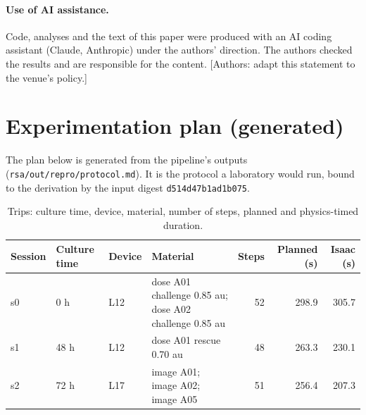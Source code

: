 \documentclass[10pt,a4paper]{article}
\begin{document}
\paragraph{Use of AI assistance.} Code, analyses and the text of this paper were produced with an AI coding assistant (Claude, Anthropic) under the authors' direction. The authors checked the results and are responsible for the content. [Authors: adapt this statement to the venue's policy.]



\appendix

\section{Experimentation plan (generated)}\label{sec:protocol}

The plan below is generated from the pipeline's outputs (\texttt{rsa/out/repro/protocol.md}). It is the protocol a laboratory would run, bound to the derivation by the input digest \texttt{d514d47b1ad1b075}.

\begin{table}[tbp]\centering\small
\caption{Trips: culture time, device, material, number of steps, planned and physics-timed duration.}\label{tab:sessions}
\begin{tabularx}{\linewidth}{lllXrrr}\toprule
\textbf{Session} & \textbf{Culture time} & \textbf{Device} & \textbf{Material} & \textbf{Steps} & \textbf{Planned (s)} & \textbf{Isaac (s)} \\\midrule
s0 & 0 h & L12 & dose A01 challenge 0.85 au; dose A02 challenge 0.85 au & 52 & 298.9 & 305.7 \\
s1 & 48 h & L12 & dose A01 rescue 0.70 au & 48 & 263.3 & 230.1 \\
s2 & 72 h & L17 & image A01; image A02; image A05 & 51 & 256.4 & 207.3 \\\bottomrule
\end{tabularx}
\end{table}
\end{document}
